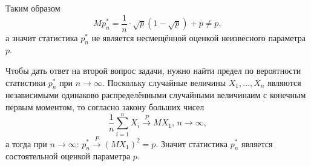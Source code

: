 Таким образом
$$Mp_n^* =
  \frac{1}{n} \cdot \sqrt{p} \left( 1 - \sqrt{p} \right) + p \neq
  p,$$
а значит статистика $p_n^*$ не является несмещённой оценкой неизвесного параметра $p$.

Чтобы дать ответ на второй вопрос задачи,
нужно найти предел по вероятности статистики $p_n^*$ при $n \to \infty $.
Поскольку случайные величины $X_1, \dotsc, X_n$
являются независимыми одинаково распределёнными случайными величинаим с конечным первым моментом,
то согласно закону больших чисел
$$ \frac{1}{n} \sum \limits_{i = 1}^n X_i \overset{P}{ \rightarrow } MX_1, \,
  n \to \infty,$$
а тогда при $n \to \infty: \, p_n^* \overset{P}{ \rightarrow } \left( MX_1 \right)^2 = p$.
Значит статистика $p_n^*$ является состоятельной оценкой параметра $p$.
